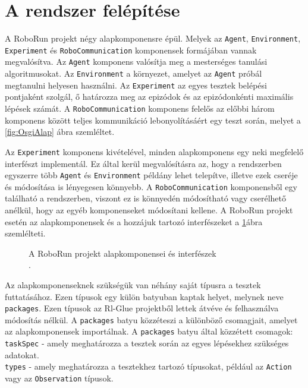 \section{A rendszer felépítése}\label{sec:Felepites}
A RoboRun projekt négy alapkomponensre épül. Melyek az \texttt{Agent}, \texttt{Environment}, \texttt{Experiment} és \texttt{RoboCommunication} komponensek formájában vannak megvalósítva. Az \texttt{Agent} komponens valósítja meg a mesterséges tanulási algoritmusokat. Az \texttt{Environment} a környezet, amelyet az \texttt{Agent} próbál megtanulni helyesen használni. Az \texttt{Experiment} az egyes tesztek belépési pontjaként szolgál, ő határozza meg az epizódok és az epizódonkénti maximális lépések számát. A \texttt{RoboCommunication} komponens felelős az előbbi három komponens között teljes kommunikáció lebonyolításáért egy teszt során, melyet a \ref{fig:OsgiAlap} ábra szemléltet.


Az \texttt{Experiment} komponens kivételével, minden alapkomponens egy neki megfelelő interfészt implementál. Ez által kerül megvalósításra az, hogy a rendszerben egyszerre több \texttt{Agent} és \texttt{Environment} példány lehet telepítve, illetve ezek cseréje és módosítása is lényegesen könnyebb. A \texttt{RoboCommunication} komponensből egy található a rendszerben, viszont ez is könnyedén módosítható vagy cserélhető anélkül, hogy az egyéb komponenseket módosítani kellene.  A RoboRun projekt esetén az alapkomponensek és a hozzájuk tartozó interfészeket a \ref{fig:RoboRunKompEsInterfesz}ábra szemlélteti.

\begin{figure}[h!]
  \centering
  \caption[A RoboRun projekt alapkomponensei és interfészek]%
  {A RoboRun projekt alapkomponensei és interfészek\\
  {\white .}\hfill\url{}}
  \label{fig:RoboRunKompEsInterfesz}
\end{figure}


Az alapkomponenseknek szükségük van néhány saját típusra a tesztek futtatásához. Ezen típusok egy külön batyuban kaptak helyet, melynek neve \texttt{packages}. Ezen típusok az Rl-Glue projektből lettek átvéve és felhasználva módosítás nélkül. A \texttt{packages} batyu közzéteszi a különböző csomagjait, amelyet az alapkomponensek importálnak. A \texttt{packages} batyu által közzétett csomagok:
\\
\texttt{taskSpec} - amely meghatározza a tesztek során az egyes lépésekhez szükséges adatokat.
\\
\texttt{types} - amely meghatározza a tesztekhez tartozó típusokat, például az \texttt{Action} vagy az \texttt{Observation} típusok.

